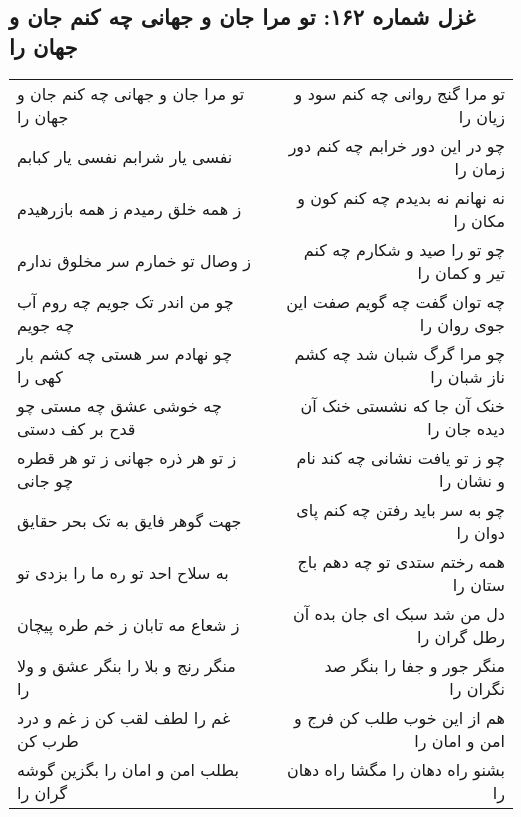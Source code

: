 \begin{center}
\section*{غزل شماره ۱۶۲: تو مرا جان و جهانی چه کنم جان و جهان را}
\label{sec:0162}
\begin{longtable}{l p{0.5cm} r}
تو مرا جان و جهانی چه کنم جان و جهان را
&&
تو مرا گنج روانی چه کنم سود و زیان را
\\
نفسی یار شرابم نفسی یار کبابم
&&
چو در این دور خرابم چه کنم دور زمان را
\\
ز همه خلق رمیدم ز همه بازرهیدم
&&
نه نهانم نه بدیدم چه کنم کون و مکان را
\\
ز وصال تو خمارم سر مخلوق ندارم
&&
چو تو را صید و شکارم چه کنم تیر و کمان را
\\
چو من اندر تک جویم چه روم آب چه جویم
&&
چه توان گفت چه گویم صفت این جوی روان را
\\
چو نهادم سر هستی چه کشم بار کهی را
&&
چو مرا گرگ شبان شد چه کشم ناز شبان را
\\
چه خوشی عشق چه مستی چو قدح بر کف دستی
&&
خنک آن جا که نشستی خنک آن دیده جان را
\\
ز تو هر ذره جهانی ز تو هر قطره چو جانی
&&
چو ز تو یافت نشانی چه کند نام و نشان را
\\
جهت گوهر فایق به تک بحر حقایق
&&
چو به سر باید رفتن چه کنم پای دوان را
\\
به سلاح احد تو ره ما را بزدی تو
&&
همه رختم ستدی تو چه دهم باج ستان را
\\
ز شعاع مه تابان ز خم طره پیچان
&&
دل من شد سبک ای جان بده آن رطل گران را
\\
منگر رنج و بلا را بنگر عشق و ولا را
&&
منگر جور و جفا را بنگر صد نگران را
\\
غم را لطف لقب کن ز غم و درد طرب کن
&&
هم از این خوب طلب کن فرج و امن و امان را
\\
بطلب امن و امان را بگزین گوشه گران را
&&
بشنو راه دهان را مگشا راه دهان را
\\
\end{longtable}
\end{center}
